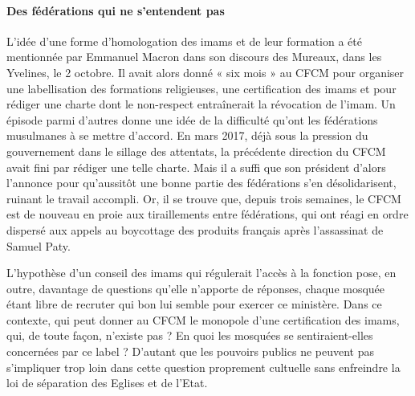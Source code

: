 \paragraph{Des fédérations qui ne s’entendent pas}
L’idée d’une forme d’homologation des imams et de leur formation a été mentionnée par Emmanuel Macron dans son discours des Mureaux, dans les Yvelines, le 2 octobre. Il avait alors donné « six mois » au CFCM pour organiser une labellisation des formations religieuses, une certification des imams et pour rédiger une charte dont le non-respect entraînerait la révocation de l’imam. Un épisode parmi d’autres donne une idée de la difficulté qu’ont les fédérations musulmanes à se mettre d’accord. En mars 2017, déjà sous la pression du gouvernement dans le sillage des attentats, la précédente direction du CFCM avait fini par rédiger une telle charte. Mais il a suffi que son président d’alors l’annonce pour qu’aussitôt une bonne partie des fédérations s’en désolidarisent, ruinant le travail accompli. Or, il se trouve que, depuis trois semaines, le CFCM est de nouveau en proie aux tiraillements entre fédérations, qui ont réagi en ordre dispersé aux appels au boycottage des produits français après l’assassinat de Samuel Paty.


 
L’hypothèse d’un conseil des imams qui régulerait l’accès à la fonction pose, en outre, davantage de questions qu’elle n’apporte de réponses, chaque mosquée étant libre de recruter qui bon lui semble pour exercer ce ministère. Dans ce contexte, qui peut donner au CFCM le monopole d’une certification des imams, qui, de toute façon, n’existe pas ? En quoi les mosquées se sentiraient-elles concernées par ce label ? D’autant que les pouvoirs publics ne peuvent pas s’impliquer trop loin dans cette question proprement cultuelle sans enfreindre la loi de séparation des Eglises et de l’Etat.
